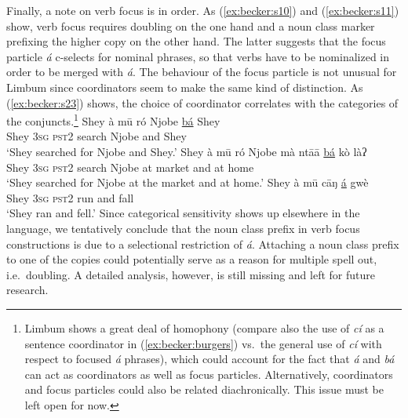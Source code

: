 \documentclass[output=paper,
modfonts
]{langscibook}
\begin{document}
Finally, a note on verb focus is in order. As (\ref{ex:becker:s10}) and (\ref{ex:becker:s11}) show, verb focus requires doubling on the one hand and a noun class marker prefixing the higher copy on the other hand. The latter suggests that the focus particle {\em \'a} c-selects for nominal phrases, so that verbs have to be nominalized in order to be merged with {\em \'a}. The behaviour of the focus particle is not unusual for Limbum since coordinators seem to make the same kind of distinction. As (\ref{ex:becker:s23}) shows, the choice of coordinator correlates with the categories of the conjuncts.\footnote{Limbum shows a great deal of homophony (compare also the use of {\em c\'i} as a sentence coordinator in (\ref{ex:becker:burgers}) vs.\ the general use of {\em c\'i} with respect to focused {\em \'a} phrases), which could account for the fact that {\em \'a} and {\em b\'a} can act as coordinators as well as focus particles. Alternatively, coordinators and focus particles could also be related diachronically. This issue must be left open for now.}
\ea \label{ex:becker:s23}
\ea
\gll Shey \`a m\=u r\'o Njobe \underline{b\'a} Shey \\ 
Shey \textsc{3sg} \textsc{pst2} search Njobe and Shey \\ 
\glt `Shey searched for Njobe and Shey.'
\ex
\gll Shey \`a m\=u r\'o Njobe m\`a nt\=a\=a \underline{b\'a} k\`o l\`aʔ \\ 
Shey \textsc{3sg} \textsc{pst2} search Njobe at market and at home \\ 
\glt `Shey searched for Njobe at the market and at home.'
\ex
\gll Shey \`a m\=u c\=aŋ \underline{\'a} gw\`e \\ 
Shey \textsc{3sg} \textsc{pst2} run and fall \\ 
\glt `Shey ran and fell.'
\z \z 
Since categorical sensitivity shows up elsewhere in the language, we tentatively conclude that the noun class prefix in verb focus constructions is due to a selectional restriction of {\em \'a}. Attaching a noun class prefix to one of the copies could potentially serve as a reason for multiple spell out, i.e.\ doubling. A detailed analysis, however, is still missing and left for future research.
\end{document}
